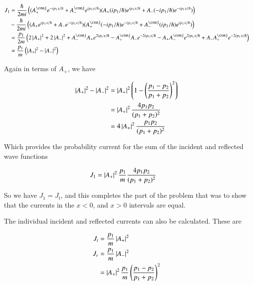 \begin{align*}
J_1
&=
\frac{\hbar}{2 m i}
\left(
(A_{+}^\conj e^{ -i p_1 x/\hbar }
+A_{-}^\conj e^{ i p_1 x/\hbar })
(A_{+} (i p_1 /\hbar)e^{ i p_1 x/\hbar }
+A_{-} (-i p_1 /\hbar)e^{ -i p_1 x/\hbar })
\right)
\\
&
-
\frac{\hbar}{2 m i} \left(
(
A_{+} e^{ i p_1 x/\hbar } +A_{-} e^{ -i p_1 x/\hbar })
(A_{+}^\conj (-i p_1 /\hbar)e^{ -i p_1 x/\hbar }
+A_{-}^\conj (i p_1 /\hbar)e^{ i p_1 x/\hbar })
\right) \\
&=
\frac{p_1}{2m}
\left(
2\Abs{A_{+} }^2
+2\Abs{A_{-} }^2
+
A_{-}^\conj A_{+} e^{ 2 i p_1 x/\hbar }
-A_{+}^\conj A_{-} e^{ -2 i p_1 x/\hbar }
-A_{+} A_{-}^\conj e^{ 2 i p_1 x/\hbar }
+A_{-} A_{+}^\conj e^{ -2 i p_1 x/\hbar }
\right) \\
&=
\frac{p_1}{m}
\left(
\Abs{A_{+} }^2
-\Abs{A_{-} }^2
\right) \\
\end{align*}

Again in terms of $A_{+}$, we have

\begin{align*}
\left\lvert{A_{+} }\right\rvert^2 -\left\lvert{A_{-} }\right\rvert^2
&=
\left\lvert{A_{+}}\right\rvert^2 \left( 1 - \left( \frac{ p_1 - p_2 }{p_1 + p_2} \right)^2 \right) \\
&=
\left\lvert{A_{+}}\right\rvert^2
\frac{ 4 p_1 p_2 }{(p_1 + p_2)^2} \\
&=
4 \left\lvert{A_{+}}\right\rvert^2 \frac{ p_1 p_2 }{(p_1 + p_2)^2} \\
\end{align*}

Which provides the probability current for the sum of the incident and reflected wave functions

\begin{align}\label{eqn:bohm11:current1}
J_1
&=
\left\lvert{A_{+}}\right\rvert^2
\frac{p_1}{m}
\frac{ 4 p_1 p_2 }{(p_1 + p_2)^2}
\end{align}

So we have $J_1 = J_t$, and this completes the 
part of the problem that was to show that the currents in the $x<0$, and $x>0$
intervals are equal.

The individual incident and reflected currents can also be calculated.  These are

\begin{align*}
J_i &= \frac{ p_1}{m} \left\lvert{ A_{+} }\right\rvert^2 \\
J_r &= \frac{ p_1}{m} \left\lvert{ A_{-} }\right\rvert^2  \\
&=
\left\lvert{ A_{+} }\right\rvert^2
\frac{ p_1 }{m }
\left( \frac{ p_1 - p_2 }{p_1 + p_2} \right)^2
\end{align*}

